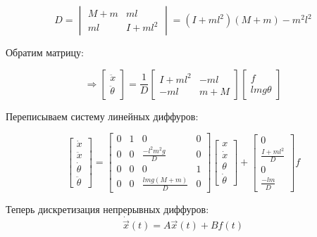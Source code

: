 \documentclass{article}
\begin{document}
$$
D = \begin{vmatrix}M+m & ml \\ ml & I+ml^2\end{vmatrix} = (I+ml^2)(M+m) - m^2l^2
$$

Обратим матрицу:

$$
\Rightarrow\begin{bmatrix}\ddot{x}\\ \ddot{\theta}\end{bmatrix} = \frac{1}{D}\begin{bmatrix}I+ml^2 & -ml \\ -ml & m+M\end{bmatrix}\begin{bmatrix}f\\ lmg\theta\end{bmatrix}
$$


Переписываем систему линейных диффуров:

$$
\begin{bmatrix}\dot{x}\\\ddot{x}\\\dot{\theta}\\\ddot{\theta}\end{bmatrix} = 
\begin{bmatrix}
0 & 1 & 0 & 0\\
0 & 0 & \frac{-l^2m^2g}{D} & 0 \\ 
0 & 0 & 0 & 1\\
0 & 0 & \frac{lmg(M+m)}{D} & 0
\end{bmatrix}
\begin{bmatrix}{x}\\\dot{x}\\{\theta}\\\dot{\theta}\end{bmatrix}  +
\begin{bmatrix} 0 \\ \frac{I+ml^2}{D} \\ 0 \\ \frac{-lm}{D} \end{bmatrix} f
$$


Теперь дискретизация непрерывных диффуров:
$$
\dot{\vec{x}}(t) = A \vec{x}(t) + Bf(t)
$$
\end{document}
